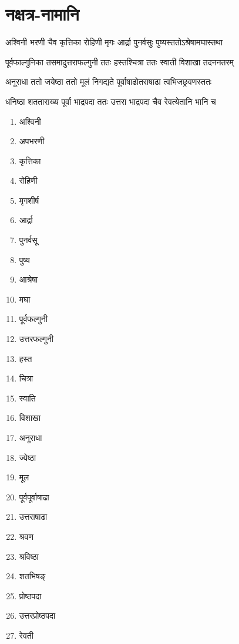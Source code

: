 \section{नक्षत्र-नामानि}
\label{app:nakshatra_names}

\twolineshloka
{अश्विनी भरणी चैव कृत्तिका रोहिणी मृगः}
{आर्द्रा पुनर्वसुः पुष्यस्ततोऽश्रेषामघास्तथा}

\twolineshloka
{पूर्वफाल्गुनिका तसमादुत्तराफल्गुनी ततः}
{हस्तश्चित्रा ततः स्वाती विशाखा तदननतरम्}

\twolineshloka
{अनूराधा ततो जयेष्ठा ततो मूलं निगद्यते}
{पूर्वाषाढोतराषाढा त्वभिजछ्रवणस्ततः}

\twolineshloka
{धनिष्ठा शतताराख्य पूर्वा भाद्रपदा ततः}
{उत्तरा भाद्रपदा चैव रेवत्येतानि भानि च}


\begin{multicols}{2}
\begin{enumerate}
\item अश्विनी
\item अपभरणी
\item कृत्तिका
\item रोहिणी
\item मृगशीर्ष
\item आर्द्रा
\item पुनर्वसू
\item पुष्य
\item आश्रेषा
\item मघा
\item पूर्वफल्गुनी
\item उत्तरफल्गुनी
\item हस्त
\item चित्रा
\item स्वाति
\item विशाखा
\item अनूराधा
\item ज्येष्ठा
\item मूल
\item पूर्वपूर्वाषाढा
\item उत्तराषाढा
\item श्रवण
\item श्रविष्ठा
\item शतभिषङ्
\item प्रोष्ठपदा
\item उत्तरप्रोष्ठपदा
\item रेवती
\end{enumerate}
\end{multicols}